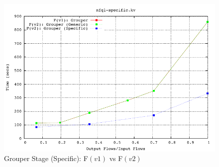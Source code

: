 \begin{figure}[h!]
  \begin{center}
    \includegraphics* [width=0.8\linewidth]{figures/benchmarks/grouper-fv1-fv2}
    \caption{Grouper Stage (Specific): F$(v1)$ vs F$(v2)$}
    \label{fig:fv1-fv2-grouper}
  \end{center}
\end{figure}

